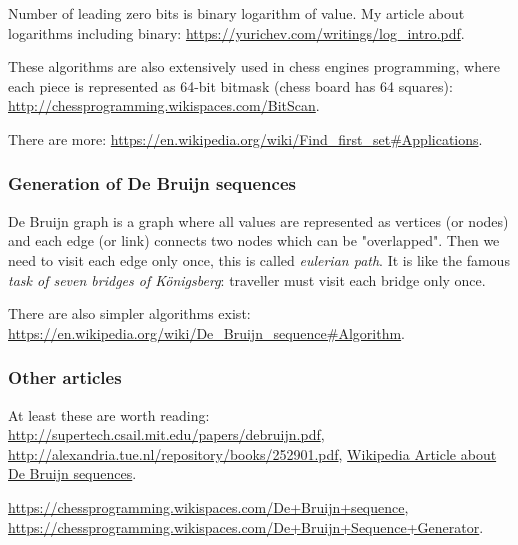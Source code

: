 Number of leading zero bits is binary logarithm of value. My article about logarithms including binary:
\url{https://yurichev.com/writings/log_intro.pdf}.

These algorithms are also extensively used in chess engines programming, where each piece is represented as 64-bit bitmask (chess board has 64 squares):
\url{http://chessprogramming.wikispaces.com/BitScan}.

There are more: \url{https://en.wikipedia.org/wiki/Find_first_set\#Applications}.

\subsubsection{Generation of De Bruijn sequences}

De Bruijn graph is a graph where all values are represented as vertices (or nodes) and each edge (or link) connects two nodes which can be "overlapped".
Then we need to visit each edge only once, this is called \textit{eulerian path}.
It is like the famous \textit{task of seven bridges of Königsberg}:
traveller must visit each bridge only once.

There are also simpler algorithms exist: \url{https://en.wikipedia.org/wiki/De_Bruijn_sequence\#Algorithm}.

\subsubsection{Other articles}

At least these are worth reading:
\url{http://supertech.csail.mit.edu/papers/debruijn.pdf},
\url{http://alexandria.tue.nl/repository/books/252901.pdf},
\href{https://en.wikipedia.org/wiki/De_Bruijn_sequence}{Wikipedia Article about De Bruijn sequences}.

\url{https://chessprogramming.wikispaces.com/De+Bruijn+sequence},
\url{https://chessprogramming.wikispaces.com/De+Bruijn+Sequence+Generator}.

